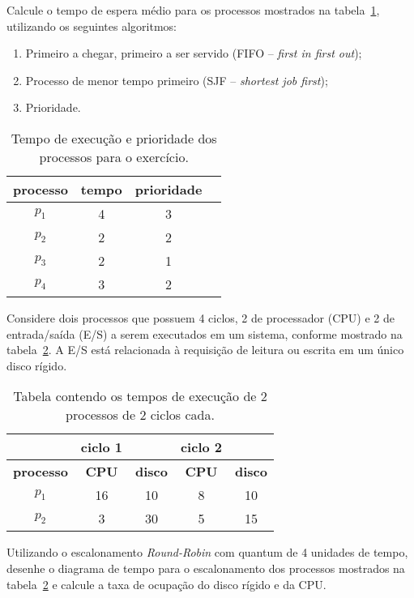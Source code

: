 
\question[1,5] Calcule o tempo de espera médio para os processos
mostrados na tabela~\ref{tab:simple}, utilizando os seguintes
algoritmos:

\begin{enumerate}
\item Primeiro a chegar, primeiro a ser servido (FIFO -- {\em first in
  first out});
\item Processo de menor tempo primeiro (SJF -- {\em shortest job first});
\item Prioridade.
\end{enumerate}

\begin{table}[h]
  \centering
  \begin{tabular}{cccc}\hline
    \bf processo & \bf tempo & \bf prioridade \\\hline
    $p_1$ & 4 & 3 \\
    $p_2$ & 2& 2\\
    $p_3$ & 2& 1\\
    $p_4$ & 3& 2\\\hline
  \end{tabular}
  \caption{Tempo de execução e prioridade dos processos para o exercício.}
  \label{tab:simple}
\end{table}

\question[2,5] Considere dois
processos que possuem 4 ciclos, 2 de processador (CPU) e 2 de
entrada/saída  (E/S) a serem executados em um sistema, conforme mostrado na
tabela~\ref{tab:ioproc}. A E/S está relacionada à requisição de
leitura ou escrita em um único disco rígido.

\begin{table}[h]
  \centering
  \begin{tabular}{c|cc|cc}\hline
    & ciclo 1 & & ciclo 2 &  \\\hline
    \bf processo & \bf CPU & \bf disco & \bf CPU & \bf disco \\\hline
    $p_1$ & 16 & 10 & 8 & 10  \\
    $p_2$ & 3 & 30 & 5 & 15 \\\hline
  \end{tabular}
  \caption{Tabela contendo os tempos de execução de 2 processos de 2
    ciclos cada.}
  \label{tab:ioproc}
\end{table}

Utilizando o escalonamento {\em Round-Robin} com quantum de 4 unidades
de tempo, desenhe o diagrama de tempo para o escalonamento dos
processos mostrados na tabela~\ref{tab:ioproc} e calcule a taxa de
ocupação do disco rígido e da CPU.


